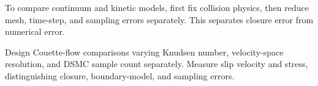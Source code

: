 To compare continuum and kinetic models, first fix collision physics,
then reduce mesh, time-step, and sampling errors separately.
This separates closure error from numerical error.

{Design Couette-flow comparisons varying Knudsen number, velocity-space resolution, and DSMC sample count separately. Measure slip velocity and stress, distinguishing closure, boundary-model, and sampling errors.}
